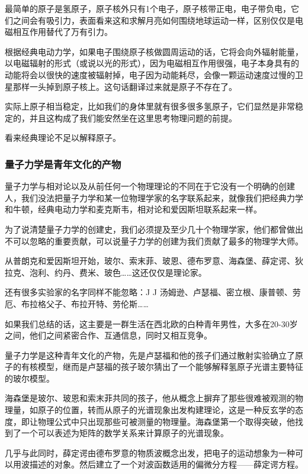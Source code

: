 最简单的原子是氢原子，原子核外只有1个电子，原子核带正电，电子带负电，它们之间会有吸引力，表面看来这和求解月亮如何围绕地球运动一样，区别仅仅是电磁相互作用替代了万有引力。

根据经典电动力学，如果电子围绕原子核做圆周运动的话，它将会向外辐射能量，以电磁辐射的形式（或说以光的形式），因为电磁相互作用很强，电子本身具有的动能将会以很快的速度被辐射掉，电子因为动能耗尽，会像一颗运动速度过慢的卫星那样一头掉到原子核上。这句话翻译过来就是原子不存在了。

实际上原子相当稳定，比如我们的身体里就有很多很多氢原子，它们显然是非常稳定的，并且这构成了我们能安然坐在这里思考物理问题的前提。

看来经典理论不足以解释原子。

\subsubsection{量子力学是青年文化的产物}

量子力学与相对论以及从前任何一个物理理论的不同在于它没有一个明确的创建人，我们没法把量子力学和某一位物理学家的名字联系起来，就像我们把经典力学和牛顿，经典电动力学和麦克斯韦，相对论和爱因斯坦联系起来一样。

为了说清楚量子力学的创建史，我们必须提及至少几十个物理学家，他们都曾做出不可以忽略的重要贡献，可以说量子力学的创建为我们贡献了最多的物理学大师。

从普朗克和爱因斯坦开始，玻尔、索末菲、玻恩、德布罗意、海森堡、薛定谔、狄拉克、泡利、约丹、费米、玻色……这还仅仅是理论家。

还有很多实验家的名字同样不能忽略：J J 汤姆逊、卢瑟福、密立根、康普顿、劳厄、布拉格父子、布拉开特、劳伦斯……

如果我们总结的话，这主要是一群生活在西北欧的白种青年男性，大多在20-30岁之间，他们之间紧密合作、互通信息，同时又相互竞争。

量子力学是这种青年文化的产物，先是卢瑟福和他的孩子们通过散射实验确立了原子的有核模型，继而是卢瑟福的孩子玻尔猜出了一个能够解释氢原子光谱主要特征的玻尔模型。

海森堡是玻尔、玻恩和索末菲共同的孩子，他从概念上摒弃了那些很难被观测的物理量，如原子的位置，转而从原子的光谱现象出发构建理论，这是一种反玄学的态度，即让物理公式中只出现那些可被测量的物理量。海森堡第一个取得突破，他找到了一个可以表述为矩阵的数学关系来计算原子的光谱现象。

几乎与此同时，薛定谔由德布罗意的物质波概念出发，把电子的运动想象为一种可以用波描述的对象。然后建立了一个对波函数适用的偏微分方程——薛定谔方程。

